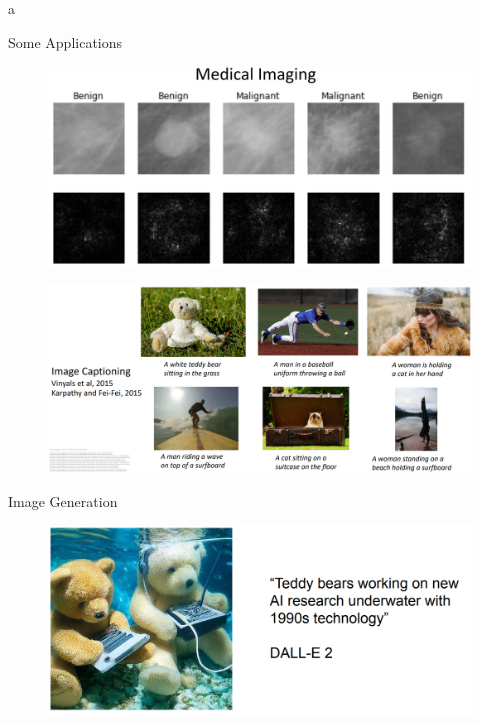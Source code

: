 a\documentclass[10pt]{beamer}
\theoremstyle{remark}
\theoremstyle{definition}
\begin{document}
\begin{frame}[allowframebreaks]{Some Applications}
\framebreak

\begin{figure}
\centering
\includegraphics[width=1.0\textwidth,height=0.9\textheight,keepaspectratio]{./images/cv_9.png}
\end{figure}

\framebreak

\begin{figure}
\centering
\includegraphics[width=1.0\textwidth,height=0.9\textheight,keepaspectratio]{./images/cv_10.png}
\end{figure}

\framebreak

\centering
Image Generation
\begin{figure}
\centering
\includegraphics[width=1.0\textwidth,height=0.9\textheight,keepaspectratio]{./images/cv_11.png}
\end{figure}


\end{frame}
\end{document}
